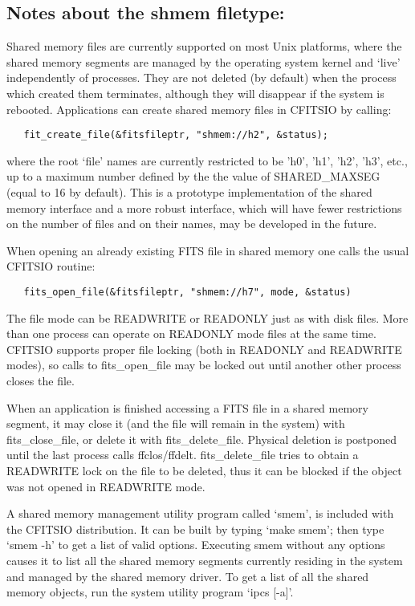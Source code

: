 \documentclass[11pt]{book}
\begin{document}
\subsection{Notes about the shmem filetype:}

Shared memory files are currently supported on most Unix platforms,
where the shared memory segments are managed by the operating system
kernel and `live' independently of processes. They are not deleted (by
default) when the process which created them terminates, although they
will disappear if the system is rebooted.  Applications can create
shared memory files in CFITSIO by calling:

\begin{verbatim}
   fit_create_file(&fitsfileptr, "shmem://h2", &status);
\end{verbatim}
where the root `file' names are currently restricted to be 'h0', 'h1',
'h2', 'h3', etc., up to a maximum number defined by the the value of
SHARED\_MAXSEG (equal to 16 by default).  This is a prototype
implementation of the shared memory interface and a more robust
interface, which will have fewer restrictions on the number of files
and on their names, may be developed in the future.

When opening an already existing FITS file in shared memory one calls
the usual CFITSIO routine:

\begin{verbatim}
   fits_open_file(&fitsfileptr, "shmem://h7", mode, &status)
\end{verbatim}
The file mode can be READWRITE or READONLY just as with disk files.
More than one process can operate on READONLY mode files at the same
time.  CFITSIO supports proper file locking (both in READONLY and
READWRITE modes), so calls to fits\_open\_file may be locked out until
another other process closes the file.

When an application is finished accessing a FITS file in a shared
memory segment, it may close it  (and the file will remain in the
system) with fits\_close\_file, or delete it with fits\_delete\_file.
Physical deletion is postponed until the last process calls
ffclos/ffdelt.  fits\_delete\_file tries to obtain a READWRITE lock on
the file to be deleted, thus it can be blocked if the object was not
opened in READWRITE mode.

A shared memory management utility program called `smem', is included
with the CFITSIO distribution.  It can be built by typing `make smem';
then type `smem -h' to get a list of valid options.  Executing smem
without any options causes it to list all the shared memory segments
currently residing in the system and managed by the shared memory
driver. To get a list of all the shared memory objects, run the system
utility program `ipcs  [-a]'.
\end{document}
